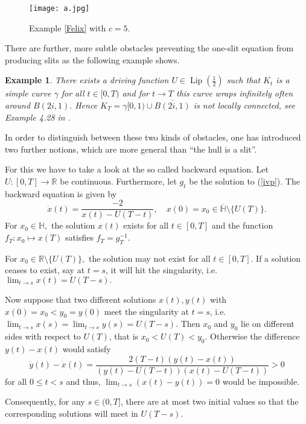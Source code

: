 \documentclass[11pt]{amsart}
\numberwithin{equation}{section}
\theoremstyle{plain}
\newtheorem{example}{Example}
\theoremstyle{definition}
\begin{document}
\begin{figure}[h] 
    \centering
   \texttt{[image: a.jpg]}
\caption{Example \ref{Felix} with $c=5.$}
 \end{figure}
There are further, more subtle obstacles preventing the one-slit equation from producing slits as the following example shows.

\begin{example}\label{spiral}
There exists a driving function $U\in {\operatorname{Lip}\left( \frac{1}{2}\right)}$ such that $K_t$ is a simple curve $\gamma$ for all $t\in [0,T)$ and for $t\to T$ this curve wraps infinitely often around $B(2i,1).$ Hence $K_T=\gamma[0,1)\cup \overline{B(2i,1)}$ is not locally connected, see Example 4.28 in \cite{Lawler:2005}.
\end{example}

In order to distinguish between these two kinds of obstacles, one has introduced two further notions, which are more general than ``the hull is a slit''.

For this we have to take a look at the so called backward equation. Let $U:[0,T]\to{\mathbb R}$ be continuous. Furthermore, let $g_t$ be the solution to (\ref{ivp}). The backward equation is given by
\begin{equation}\label{back}
 \dot{x}(t) = \frac{-2}{x(t)-U(T-t)}, \quad x(0)=x_0\in\overline{\mathbb H}\setminus\{U(T)\}.
\end{equation}
For $x_0\in {\mathbb H},$ the solution $x(t)$ exists for all $t\in[0,T]$ and the function $f_T:x_0\mapsto x(T)$ satisfies $f_T=g_T^{-1}.$

For $x_0\in {\mathbb R}\setminus\{U(T)\},$ the solution may not exist for all $t\in[0,T].$ If a solution ceases to exist, say at $t=s$, it will hit the singularity, i.e. $\lim_{t\to s}x(t)=U(T-s).$

Now suppose that two different solutions $x(t),y(t)$ with $x(0)=x_0<y_0=y(0)$ meet the singularity at $t=s$, i.e. $\lim_{t\to s}x(s)=\lim_{t\to s}y(s)=U(T-s)$. Then $x_0$ and $y_0$ lie on different sides  with respect to $U(T)$, that is $x_0<U(T)<y_0.$ Otherwise the difference $y(t)-x(t)$ would satisfy 
$$ \dot{y}(t)-\dot{x}(t)= \frac{2(T-t)(y(t)-x(t))}{(y(t)-U(T-t))(x(t)-U(T-t))}>0$$
for all $0\leq t<s$ and thus, $\lim_{t\to s}(x(t)-y(t))=0$ would be impossible.

Consequently, for any $s\in(0,T]$, there are at most two initial values so that the corresponding solutions will meet in $U(T-s)$.
\end{document}
